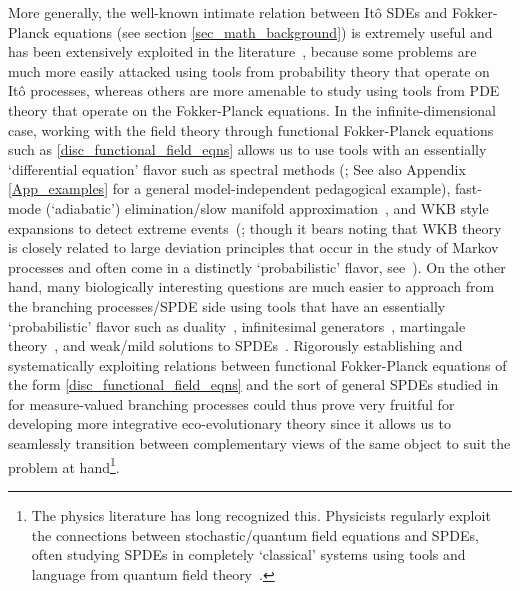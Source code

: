 More generally, the well-known intimate relation between It\^o SDEs and Fokker-Planck equations (see section \ref{sec_math_background}) is extremely useful and has been extensively exploited in the literature~\citep{van_kampen_stochastic_1981,oksendal_stochastic_1998, gardiner_stochastic_2009}, because some problems are much more easily attacked using tools from probability theory that operate on It\^o processes, whereas others are more amenable to study using tools from PDE theory that operate on the Fokker-Planck equations. In the infinite-dimensional case, working with the field theory through functional Fokker-Planck equations such as \eqref{disc_functional_field_eqns} allows us to use tools with an essentially `differential equation' flavor such as spectral methods (\cite{rogers_demographic_2012, rogers_modes_2015}; See also Appendix \ref{App_examples} for a general model-independent pedagogical example), fast-mode (`adiabatic') elimination/slow manifold approximation~\citep{constable_stochastic_2013,parsons_dimension_2017}, and WKB style expansions to detect extreme events~(\cite{rogers_demographic_2012,assaf_wkb_2017}; though it bears noting that WKB theory is closely related to large deviation principles that occur in the study of Markov processes and often come in a distinctly `probabilistic' flavor, see~\cite{dembo_large_1998}). On the other hand, many biologically interesting questions are much easier to approach from the branching processes/SPDE side using tools that have an essentially `probabilistic' flavor such as duality~\citep{dawson_stochastic_1975,greenman_duality_2020}, infinitesimal generators~\citep{ethier_markov_1986,etheridge_mathematical_2011}, martingale theory~\citep{champagnat_unifying_2006,etheridge_mathematical_2011}, and weak/mild solutions to SPDEs~\citep{week_white_2021}. Rigorously establishing and systematically exploiting relations between functional Fokker-Planck equations of the form \eqref{disc_functional_field_eqns} and the sort of general SPDEs studied in~\cite{week_white_2021} for measure-valued branching processes could thus prove very fruitful for developing more integrative eco-evolutionary theory since it allows us to seamlessly transition between complementary views of the same object to suit the problem at hand\footnote{The physics literature has long recognized this. Physicists regularly exploit the connections between stochastic/quantum field equations and SPDEs, often studying SPDEs in completely `classical' systems using tools and language from quantum field theory~\citep{hochberg_effective_1999,baez_quantum_2018}.}.

